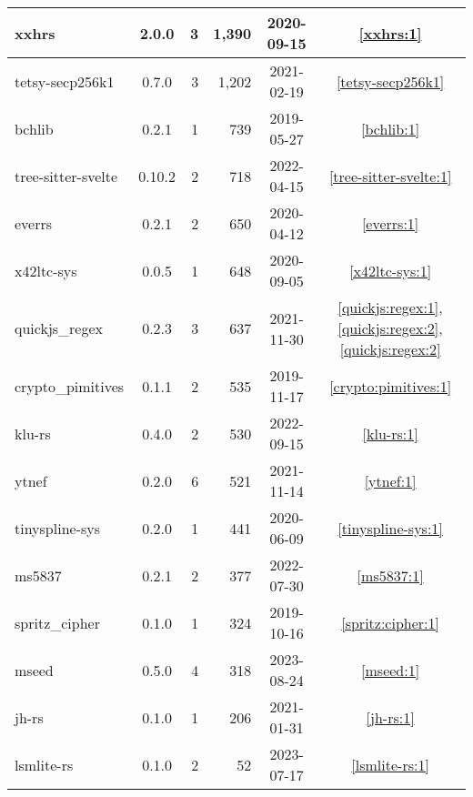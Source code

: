 \begin{tabular}{|l|c|r|r|c|c|}
   \hline
xxhrs & 2.0.0 & 3 & 1,390 & 2020-09-15 & \ref{xxhrs:1} \\ 
   \hline
tetsy-secp256k1 & 0.7.0 & 3 & 1,202 & 2021-02-19 & \ref{tetsy-secp256k1} \\ 
   \hline
bchlib & 0.2.1 & 1 & 739 & 2019-05-27 & \ref{bchlib:1} \\ 
   \hline
tree-sitter-svelte & 0.10.2 & 2 & 718 & 2022-04-15 & \ref{tree-sitter-svelte:1} \\ 
   \hline
everrs & 0.2.1 & 2 & 650 & 2020-04-12 & \ref{everrs:1} \\ 
   \hline
x42ltc-sys & 0.0.5 & 1 & 648 & 2020-09-05 & \ref{x42ltc-sys:1} \\ 
   \hline
quickjs\_regex & 0.2.3 & 3 & 637 & 2021-11-30 & \ref{quickjs:regex:1}, \ref{quickjs:regex:2}, \ref{quickjs:regex:2} \\ 
   \hline
crypto\_pimitives & 0.1.1 & 2 & 535 & 2019-11-17 & \ref{crypto:pimitives:1} \\ 
   \hline
klu-rs & 0.4.0 & 2 & 530 & 2022-09-15 & \ref{klu-rs:1} \\ 
   \hline
ytnef & 0.2.0 & 6 & 521 & 2021-11-14 & \ref{ytnef:1} \\ 
   \hline
tinyspline-sys & 0.2.0 & 1 & 441 & 2020-06-09 & \ref{tinyspline-sys:1} \\ 
   \hline
ms5837 & 0.2.1 & 2 & 377 & 2022-07-30 & \ref{ms5837:1} \\ 
   \hline
spritz\_cipher & 0.1.0 & 1 & 324 & 2019-10-16 & \ref{spritz:cipher:1} \\ 
   \hline
mseed & 0.5.0 & 4 & 318 & 2023-08-24 & \ref{mseed:1} \\ 
   \hline
jh-rs & 0.1.0 & 1 & 206 & 2021-01-31 & \ref{jh-rs:1} \\ 
   \hline
lsmlite-rs & 0.1.0 & 2 & 52 & 2023-07-17 & \ref{lsmlite-rs:1} \\ 
   \hline
\end{tabular}
